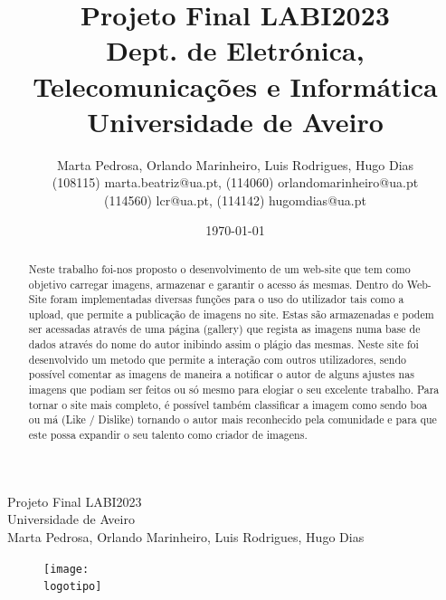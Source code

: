 \documentclass{report}
\begin{document}
%
\def\titulo{Projeto Final LABI2023}
\def\data{16 junho 2021}
\def\autores{Marta Pedrosa, Orlando Marinheiro, Luis Rodrigues, Hugo Dias}
\def\autorescontactos{(108115) marta.beatriz@ua.pt, (114060) orlandomarinheiro@ua.pt\\(114560) lcr@ua.pt, (114142) hugomdias@ua.pt}

\def\departamento{Dept. de Eletrónica, Telecomunicações e Informática}
\def\empresa{Universidade de Aveiro}
\def\logotipo{ua.pdf}
%
%
\begin{titlepage}

\begin{center}
%
\vspace*{50mm}
%
{\Huge \titulo}\\ 
%
\vspace{10mm}
%
{\Large \empresa}\\
%
\vspace{10mm}
%
{\LARGE \autores}\\ 
%
\vspace{30mm}
%
\begin{figure}[h]
\center
\texttt{[image: \\logotipo]}
\end{figure}
%
\vspace{30mm}
\end{center}
%

\end{titlepage}

\title{%
{\Huge\textbf{\titulo}}\\ [10pt]
{\Large \departamento\\ \empresa}
}
%
\author{%
    \autores \\
    \autorescontactos
}
%
\date{\today}
%
\maketitle


\begin{abstract}
Neste trabalho foi-nos proposto o desenvolvimento de um web-site que tem como objetivo carregar imagens, armazenar e garantir o acesso ás mesmas.
Dentro do Web-Site foram implementadas diversas funções para o uso do utilizador tais como a upload, que permite a publicação de imagens no site. Estas são armazenadas e podem ser acessadas através de uma página (gallery) que regista as imagens numa base de dados através do nome do autor inibindo assim o plágio das mesmas.
Neste site foi desenvolvido um metodo que permite a interação com outros utilizadores, sendo possível comentar as imagens de maneira a notificar o autor de alguns ajustes nas imagens que podiam ser feitos ou só mesmo para elogiar o seu excelente trabalho.
Para tornar o site mais completo, é possível também classificar a imagem como sendo boa ou má (Like / Dislike) tornando o autor mais reconhecido pela comunidade e para que este possa expandir o seu talento como criador de imagens.


\end{abstract}
\end{document}
